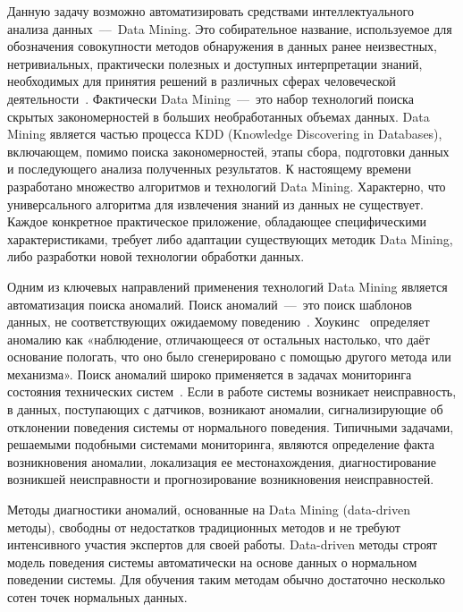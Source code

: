 Данную задачу возможно автоматизировать средствами интеллектуального анализа данных~--–~Data Mining. Это собирательное название, используемое для обозначения совокупности методов обнаружения в данных ранее неизвестных, нетривиальных, практически полезных и доступных интерпретации знаний, необходимых для принятия решений в различных сферах человеческой деятельности~\cite{ShapiroDataMining}. Фактически Data Mining~---~это набор технологий поиска скрытых закономерностей в больших необработанных объемах данных. Data Mining является частью процесса KDD (Knowledge Discovering in Databases), включающем, помимо поиска закономерностей, этапы сбора, подготовки данных и последующего анализа полученных результатов. К настоящему времени разработано множество алгоритмов и технологий Data Mining. Характерно, что универсального алгоритма для извлечения знаний из данных не существует. Каждое конкретное практическое приложение, обладающее специфическими характеристиками, требует либо адаптации существующих методик Data Mining, либо разработки новой технологии обработки данных.

Одним из ключевых направлений применения технологий Data Mining является автоматизация поиска аномалий. Поиск аномалий~---~это поиск шаблонов данных, не соответствующих ожидаемому поведению~\cite{AnomalyDetectionASurvey}. Хоукинс~\cite{HawkinsIdOfOutliers} определяет аномалию как «наблюдение, отличающееся от остальных настолько, что даёт основание пологать, что оно было сгенерировано с помощью другого метода или механизма». Поиск аномалий широко применяется в задачах мониторинга состояния технических систем~\cite{DerevyanenkoDataMining}. Если в работе системы возникает неисправность, в данных, поступающих с датчиков, возникают аномалии, сигнализирующие об отклонении поведения системы от нормального поведения. Типичными задачами, решаемыми подобными системами мониторинга, являются определение факта возникновения аномалии, локализация ее местонахождения, диагностирование возникшей неисправности и прогнозирование возникновения неисправностей.

Методы диагностики аномалий, основанные на Data Mining (data-driven методы), свободны от недостатков традиционных методов и не требуют интенсивного участия экспертов для своей работы. Data-driven методы строят модель поведения системы автоматически на основе данных о нормальном поведении системы. Для обучения таким методам обычно достаточно несколько сотен точек нормальных данных.

